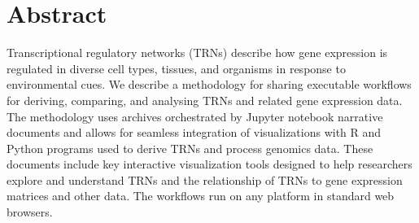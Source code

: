 \documentclass[10pt,letterpaper]{article}
\begin{document}


\maketitle

\section*{Abstract}
Transcriptional regulatory networks (TRNs) 
describe how gene expression is regulated in diverse cell types, tissues, and
organisms in response to environmental cues.    
We describe a methodology for sharing 
executable workflows for deriving, comparing,  and analysing TRNs and 
related gene expression data.  
The methodology uses archives orchestrated 
by Jupyter notebook narrative documents and allows for seamless integration
of visualizations with R and Python programs used to derive TRNs and process
genomics data.  
These documents include key 
interactive visualization tools designed to help researchers explore and 
understand TRNs and the relationship of TRNs to gene expression matrices 
and other data.  The workflows run on any platform in standard web browsers.


\end{document}
